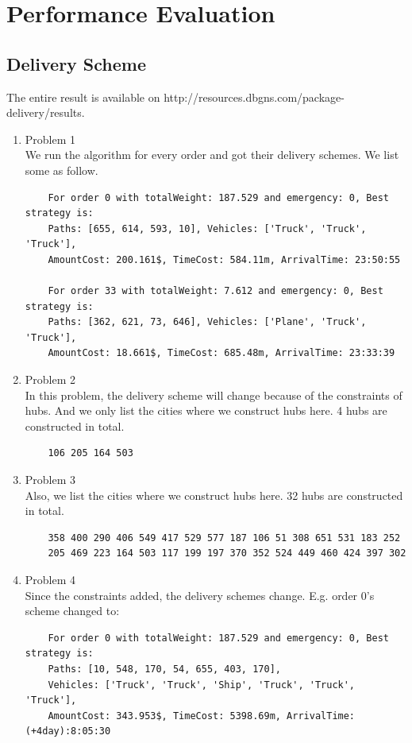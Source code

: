 \documentclass[11pt, a4paper]{article} %
\begin{document}
\section{Performance Evaluation}
\subsection{Delivery Scheme}
	The entire result is available on http://resources.dbgns.com/package-delivery/results.
\begin{enumerate}
	\item Problem 1\\
	We run the algorithm for every order and got their delivery schemes. We list some as follow. 
	\begin{verbatim}
	For order 0 with totalWeight: 187.529 and emergency: 0, Best strategy is:
	Paths: [655, 614, 593, 10], Vehicles: ['Truck', 'Truck', 'Truck'], 
	AmountCost: 200.161$, TimeCost: 584.11m, ArrivalTime: 23:50:55
	
	For order 33 with totalWeight: 7.612 and emergency: 0, Best strategy is:
	Paths: [362, 621, 73, 646], Vehicles: ['Plane', 'Truck', 'Truck'], 
	AmountCost: 18.661$, TimeCost: 685.48m, ArrivalTime: 23:33:39
	\end{verbatim}
	\item Problem 2\\
	In this problem, the delivery scheme will change because of the constraints of hubs. And we only list the cities where we construct hubs here. 4 hubs are constructed in total.
	\begin{verbatim}
	106 205 164 503 
	\end{verbatim}
	\item Problem 3\\
	Also, we list the cities where we construct hubs here. 32 hubs are constructed in total.
	\begin{verbatim}
	358 400 290 406 549 417 529 577 187 106 51 308 651 531 183 252
	205 469 223 164 503 117 199 197 370 352 524 449 460 424 397 302 
	\end{verbatim}
	\item Problem 4\\
	Since the constraints added, the delivery schemes change. E.g. order 0's scheme changed to:
	\begin{verbatim}
	For order 0 with totalWeight: 187.529 and emergency: 0, Best strategy is:
	Paths: [10, 548, 170, 54, 655, 403, 170],
	Vehicles: ['Truck', 'Truck', 'Ship', 'Truck', 'Truck', 'Truck'], 
	AmountCost: 343.953$, TimeCost: 5398.69m, ArrivalTime: (+4day):8:05:30
	\end{verbatim}
\end{enumerate}
\end{document}
